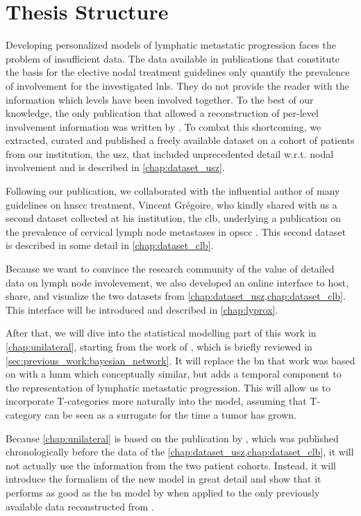\documentclass[\relativeRoot/main.tex]{subfiles}
\begin{document}
\section{Thesis Structure}
\label{sec:intro:structure}

Developing personalized models of lymphatic metastatic progression faces the problem of insufficient data. The data available in publications that constitute the basis for the elective nodal treatment guidelines only quantify the prevalence of involvement for the investigated \glspl{lnl}. They do not provide the reader with the information which levels have been involved together. To the best of our knowledge, the only publication that allowed a reconstruction of per-level involvement information was written by . To combat this shortcoming, we extracted, curated and published a freely available dataset on a cohort of patients from our institution, the \gls{usz}, that included unprecedented detail w.r.t. nodal involvement and is described in \cref{chap:dataset_usz}.

Following our publication, we collaborated with the influential author of many guidelines on \gls{hnscc} treatment, Vincent Grégoire, who kindly shared with us a second dataset collected at his institution, the \gls{clb}, underlying a publication on the prevalence of cervical lymph node metastases in \gls{opscc} \cite{bauwens_prevalence_2021}. This second dataset is described in some detail in \cref{chap:dataset_clb}.

Because we want to convince the research community of the value of detailed data on lymph node involevement, we also developed an online interface to host, share, and visualize the two datasets from \cref{chap:dataset_usz,chap:dataset_clb}. This interface will be introduced and described in \cref{chap:lyprox}.

After that, we will dive into the statistical modelling part of this work in \cref{chap:unilateral}, starting from the  work of , which is briefly reviewed in \cref{sec:previous_work:bayesian_network}. It will replace the \gls{bn} that work was based on with a \gls{hmm} which conceptually similar, but adds a temporal component to the representation of lymphatic metastatic progression. This will allow us to incorporate T-categories more naturally into the model, assuming that T-category can be seen as a surrogate for the time a tumor has grown.

Because \cref{chap:unilateral} is based on the publication by , which was published chronologically before the data of the \cref{chap:dataset_usz,chap:dataset_clb}, it will not actually use the information from the two patient cohorts. Instead, it will introduce the formalism of the new model in great detail and show that it performs as good as the \gls{bn} model by  when applied to the only previously available data reconstructed from .
\end{document}
